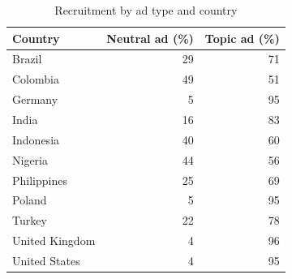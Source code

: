 \begin{table}

\caption{\label{tab:survey-adtype}Recruitment by ad type and country}
\centering
\begin{tabular}[t]{lrr}
\toprule
\textbf{Country} & \textbf{Neutral ad (\%)} & \textbf{Topic ad (\%)}\\
\midrule
Brazil & 29 & 71\\
Colombia & 49 & 51\\
Germany & 5 & 95\\
India & 16 & 83\\
Indonesia & 40 & 60\\
Nigeria & 44 & 56\\
Philippines & 25 & 69\\
Poland & 5 & 95\\
Turkey & 22 & 78\\
United Kingdom & 4 & 96\\
United States & 4 & 95\\
\bottomrule
\end{tabular}
\end{table}
